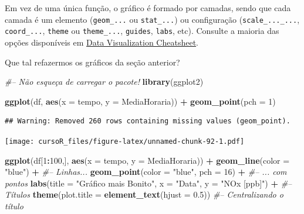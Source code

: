\documentclass[]{book}
\newenvironment{Shaded}{\begin{snugshade}}{\end{snugshade}}
\newcommand{\KeywordTok}[1]{\textcolor[rgb]{0.13,0.29,0.53}{\textbf{#1}}}
\newcommand{\DataTypeTok}[1]{\textcolor[rgb]{0.13,0.29,0.53}{#1}}
\newcommand{\DecValTok}[1]{\textcolor[rgb]{0.00,0.00,0.81}{#1}}
\newcommand{\FloatTok}[1]{\textcolor[rgb]{0.00,0.00,0.81}{#1}}
\newcommand{\StringTok}[1]{\textcolor[rgb]{0.31,0.60,0.02}{#1}}
\newcommand{\CommentTok}[1]{\textcolor[rgb]{0.56,0.35,0.01}{\textit{#1}}}
\newcommand{\OperatorTok}[1]{\textcolor[rgb]{0.81,0.36,0.00}{\textbf{#1}}}
\newcommand{\NormalTok}[1]{#1}
\theoremstyle{definition}
\theoremstyle{definition}
\theoremstyle{definition}
\theoremstyle{remark}
\begin{document}
Em vez de uma única função, o gráfico é formado por camadas, sendo que
cada camada é um elemento (\texttt{geom\_...} ou \texttt{stat\_...}) ou
configuração (\texttt{scale\_...\_...}, \texttt{coord\_...},
\texttt{theme} ou \texttt{theme\_...}, \texttt{guides}, \texttt{labs},
etc). Consulte a maioria das opções disponíveis em
\href{https://github.com/rstudio/cheatsheets/raw/master/data-visualization-2.1.pdf}{Data
Visualization Cheatsheet}.

Que tal refazermos os gráficos da seção anterior?

\begin{Shaded}
\begin{Highlighting}[]
\CommentTok{#-- Não esqueça de carregar o pacote!}
\KeywordTok{library}\NormalTok{(ggplot2)}
\end{Highlighting}
\end{Shaded}

\begin{Shaded}
\begin{Highlighting}[]
\KeywordTok{ggplot}\NormalTok{(df, }\KeywordTok{aes}\NormalTok{(}\DataTypeTok{x =}\NormalTok{ tempo, }\DataTypeTok{y =}\NormalTok{ MediaHoraria)) }\OperatorTok{+}
\StringTok{  }\KeywordTok{geom_point}\NormalTok{(}\DataTypeTok{pch =} \DecValTok{1}\NormalTok{)}
\end{Highlighting}
\end{Shaded}

\begin{verbatim}
## Warning: Removed 260 rows containing missing values (geom_point).
\end{verbatim}

\texttt{[image: cursoR\_files/figure-latex/unnamed-chunk-92-1.pdf]}

\begin{Shaded}
\begin{Highlighting}[]
\KeywordTok{ggplot}\NormalTok{(df[}\DecValTok{1}\OperatorTok{:}\DecValTok{100}\NormalTok{,], }\KeywordTok{aes}\NormalTok{(}\DataTypeTok{x =}\NormalTok{ tempo, }\DataTypeTok{y =}\NormalTok{ MediaHoraria)) }\OperatorTok{+}\StringTok{ }
\StringTok{  }\KeywordTok{geom_line}\NormalTok{(}\DataTypeTok{color =} \StringTok{"blue"}\NormalTok{) }\OperatorTok{+}\StringTok{ }\CommentTok{#-- Linhas...}
\StringTok{  }\KeywordTok{geom_point}\NormalTok{(}\DataTypeTok{color =} \StringTok{"blue"}\NormalTok{, }\DataTypeTok{pch =} \DecValTok{16}\NormalTok{) }\OperatorTok{+}\StringTok{ }\CommentTok{#-- ... com pontos}
\StringTok{  }\KeywordTok{labs}\NormalTok{(}\DataTypeTok{title =} \StringTok{"Gráfico mais Bonito"}\NormalTok{, }\DataTypeTok{x =} \StringTok{"Data"}\NormalTok{, }\DataTypeTok{y =} \StringTok{"NOx [ppb]"}\NormalTok{) }\OperatorTok{+}\StringTok{ }\CommentTok{#-- Títulos}
\StringTok{  }\KeywordTok{theme}\NormalTok{(}\DataTypeTok{plot.title =} \KeywordTok{element_text}\NormalTok{(}\DataTypeTok{hjust =} \FloatTok{0.5}\NormalTok{)) }\CommentTok{#-- Centralizando o título}
\end{Highlighting}
\end{Shaded}
\end{document}
